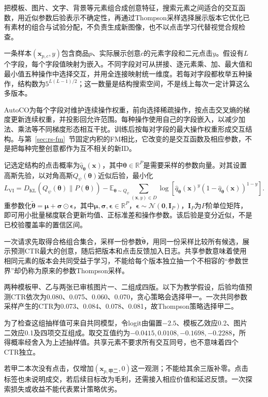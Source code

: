 把模板、图片、文字、背景等元素组合成创意特征，搜索元素之间适合的交互函数，用近似参数后验表示不确定性，再通过Thompson采样选择展示版本它优化已有素材的组合与试验分配，不负责生成新图像，也不以点击学习代替视觉合规检查。

一条样本$(\bm{x}_{p,c},y)$包含商品$p$、实际展示创意$c$的元素字段和二元点击$y$。假设有$L$个字段，每个字段值映射为嵌入。不同字段对可从拼接、逐元素乘、加、最大值和最小值五种操作中选择交互，并用全连接映射统一维度。若每对字段都枚举五种操作，结构数为$5^{L(L-1)/2}$；这一数量是结构搜索空间，不是线上每次一定计算这么多版本。

AutoCO为每个字段对维护连续操作权重，前向选择稀疏操作，按点击交叉熵的梯度更新连续权重，并投影回允许范围。每种操作使用自己的字段嵌入，以减少加法、乘法等不同梯度形态相互干扰。训练后按每对字段的最大操作权重形成交互结构。与第~\ref{sec:rs-fm}~节固定内积的FM相比，它改变的是交互函数及相应参数，不是把每种完整创意都作为互不相关的新ID。

记选定结构的点击概率为$\widehat q_{\bm{\theta}}(\bm{x})$，其中$\bm{\theta}\in\mathbb R^P$是需要采样的参数向量。对其设置高斯先验，以对角高斯$Q_\psi(\bm{\theta})$近似后验，最小化
\begin{equation}
  L_{\mathrm{VI}}
    =D_{\mathrm{KL}}(Q_\psi(\bm{\theta})\|P(\bm{\theta}))
      -\mathbb{E}_{\bm{\theta}\sim Q_\psi}
        \sum_{(\bm{x},y)\in D}
         \log\!\left[
           \widehat q_{\bm{\theta}}(\bm{x})^y
           (1-\widehat q_{\bm{\theta}}(\bm{x}))^{1-y}
         \right].
  \label{eq:rs-advertising-autoco}
\end{equation}
重参数化$\widetilde{\bm{\theta}}=\bm{\mu}+\bm{\sigma}\odot\bm{\epsilon}$，其中$\bm{\mu},\bm{\sigma},\bm{\epsilon}\in\mathbb R^P$，$\bm{\epsilon}\sim\mathcal N(\bm{0},\bm{I}_P)$，$\bm{I}_P$为$P$阶单位矩阵，即可用小批量梯度联合更新均值、正标准差和操作参数。该后验是变分近似，不是已校验覆盖率的置信区间。

一次请求先取得合格组合集合，采样一份参数$\widetilde{\bm{\theta}}$，用同一份采样比较所有候选，展示预测CTR最大的创意，随后把版本和点击反馈加入日志。共享参数意味着使用相同元素的版本会共同受益于学习，不能给每个版本独立抽一个不相容的“参数世界”却仍称为原来的参数Thompson采样。

\begin{example}[四个创意版本的一次选择]
两种模板甲、乙与两张已审核图片一、二组成四版。以下为教学假设，后验均值预测CTR依次为0.080、0.075、0.060、0.070，贪心策略会选择甲一。一次共同参数采样产生的CTR为0.073、0.084、0.078、0.081，故Thompson策略选择甲二。

为了检查这组抽样值可来自共同模型，令logit由偏置$-2.5$、模板乙效应0.2、图片二效应0.1及四项交互组成。取交互值约为$-0.0415,0.0108,-0.1698,-0.2288$，所得概率经舍入为上述抽样值。共享元素不要求所有交互同号，也不意味着四个CTR独立。

若甲二本次没有点击，仅增加$(\bm{x}_{p,\text{甲二}},0)$这一观测；不能给其余三版补零。点击标签也未说明成交，若后续目标改为毛利，还需接入相应价值和延迟反馈。一次探索损失或收益不能代表累计策略优劣。
\end{example}

